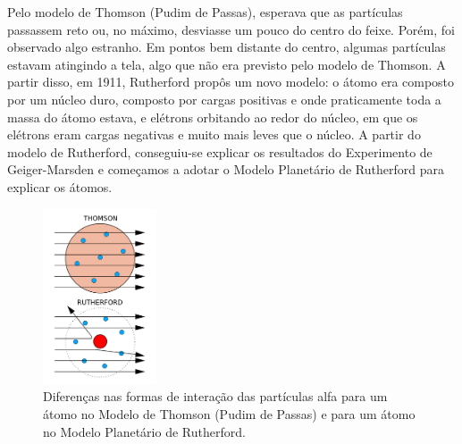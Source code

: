 \documentclass[12pt]{extarticle}
\newcommand{\<}{\langle}
\renewcommand{\>}{\rangle}
\theoremstyle{definition}
\begin{document}
Pelo modelo de Thomson (Pudim de Passas), esperava que as partículas passassem reto ou, no máximo, desviasse um pouco do centro do feixe. Porém, foi observado algo estranho. Em pontos bem distante do centro, algumas partículas estavam atingindo a tela, algo que não era previsto pelo modelo de Thomson. A partir disso, em 1911, Rutherford propôs um novo modelo: o átomo era composto por um núcleo duro, composto por cargas positivas e onde praticamente toda a massa do átomo estava, e elétrons orbitando ao redor do núcleo, em que os elétrons eram cargas negativas e muito mais leves que o núcleo. A partir do modelo de Rutherford, conseguiu-se explicar os resultados do Experimento de Geiger-Marsden e começamos a adotar o Modelo Planetário de Rutherford para explicar os átomos.
\begin{figure}[H]
    \centering
    \includegraphics[width=0.3\textwidth]{f2.png}
    \caption{Diferenças nas formas de interação das partículas alfa para um átomo no Modelo de Thomson (Pudim de Passas) e para um átomo no Modelo Planetário de Rutherford.}
    \label{fig:thomson_rutherford}
\end{figure}
\end{document}
